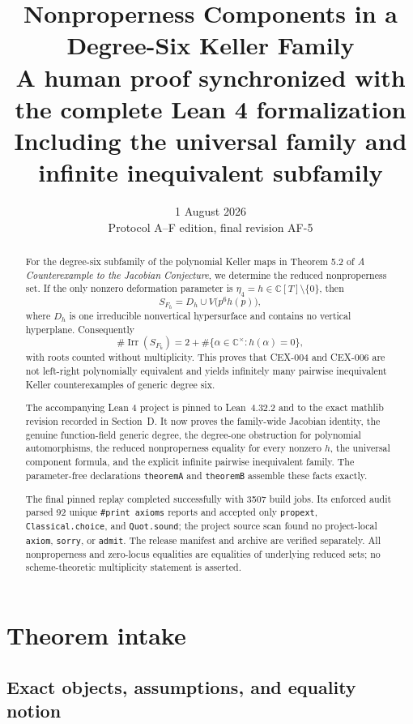 \documentclass[11pt]{article}
\title{\textbf{Nonproperness Components in a Degree-Six Keller Family}\\[0.35em]
\large A human proof synchronized with the complete Lean 4 formalization\\[0.2em]
\normalsize Including the universal family and infinite inequivalent subfamily}
\author{}
\date{1 August 2026\\[0.25em]\small Protocol A--F edition, final revision AF-5}
\newcommand{\C}{\mathbb{C}}
\newcommand{\Irr}{\operatorname{Irr}}
\begin{document}
\maketitle

\begin{abstract}
For the degree-six subfamily of the polynomial Keller maps in Theorem 5.2 of
\emph{A Counterexample to the Jacobian Conjecture}, we determine the reduced
nonproperness set.  If the only nonzero deformation parameter is
$\eta_4=h\in\C[T]\setminus\{0\}$, then
\[
 S_{F_h}=D_h\cup V\bigl(p^6h(p)\bigr),
\]
where $D_h$ is one irreducible nonvertical hypersurface and contains no
vertical hyperplane.  Consequently
\[
 \#\Irr(S_{F_h})
 =2+\#\{\alpha\in\C^\times:h(\alpha)=0\},
\]
with roots counted without multiplicity.  This proves that CEX-004 and
CEX-006 are not left-right polynomially equivalent and yields infinitely many
pairwise inequivalent Keller counterexamples of generic degree six.

The accompanying Lean 4 project is pinned to Lean~4.32.2 and to the exact
mathlib revision recorded in Section~D.  It now proves the family-wide
Jacobian identity, the genuine function-field generic degree, the degree-one
obstruction for polynomial automorphisms, the reduced nonproperness equality
for every nonzero $h$, the universal component formula, and the explicit
infinite pairwise inequivalent family.  The parameter-free declarations
\texttt{theoremA} and \texttt{theoremB} assemble these facts exactly.

The final pinned replay completed successfully with 3507 build jobs.  Its
enforced audit parsed 92 unique \texttt{\#print axioms} reports and accepted
only \texttt{propext}, \texttt{Classical.choice}, and \texttt{Quot.sound}; the
project source scan found no project-local \texttt{axiom}, \texttt{sorry}, or
\texttt{admit}.  The release manifest and archive are verified separately.
All nonproperness and zero-locus equalities are equalities of underlying
reduced sets; no scheme-theoretic multiplicity statement is asserted.
\end{abstract}

\tableofcontents

\section{Theorem intake}

\subsection{Exact objects, assumptions, and equality notion}
\end{document}
